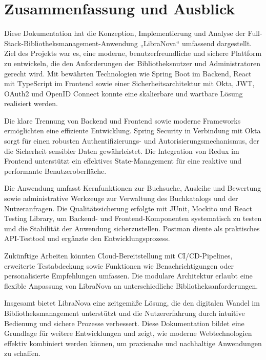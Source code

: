 \chapter{Zusammenfassung und Ausblick}

Diese Dokumentation hat die Konzeption, Implementierung und Analyse der Full-Stack-Bibliotheksmanagement-Anwendung „LibraNova“ umfassend dargestellt. Ziel des Projekts war es, eine moderne, benutzerfreundliche und sichere Plattform zu entwickeln, die den Anforderungen der Bibliotheksnutzer und Administratoren gerecht wird. Mit bewährten Technologien wie Spring Boot im Backend, React mit TypeScript im Frontend sowie einer Sicherheitsarchitektur mit Okta, JWT, OAuth2 und OpenID Connect konnte eine skalierbare und wartbare Lösung realisiert werden.

Die klare Trennung von Backend und Frontend sowie moderne Frameworks ermöglichten eine effiziente Entwicklung. Spring Security in Verbindung mit Okta sorgt für einen robusten Authentifizierungs- und Autorisierungsmechanismus, der die Sicherheit sensibler Daten gewährleistet. Die Integration von Redux im Frontend unterstützt ein effektives State-Management für eine reaktive und performante Benutzeroberfläche.

Die Anwendung umfasst Kernfunktionen zur Buchsuche, Ausleihe und Bewertung sowie administrative Werkzeuge zur Verwaltung des Buchkatalogs und der Nutzeranfragen. Die Qualitätssicherung erfolgte mit JUnit, Mockito und React Testing Library, um Backend- und Frontend-Komponenten systematisch zu testen und die Stabilität der Anwendung sicherzustellen. Postman diente als praktisches API-Testtool und ergänzte den Entwicklungsprozess.

Zukünftige Arbeiten könnten Cloud-Bereitstellung mit CI/CD-Pipelines, erweiterte Testabdeckung sowie Funktionen wie Benachrichtigungen oder personalisierte Empfehlungen umfassen. Die modulare Architektur erlaubt eine flexible Anpassung von LibraNova an unterschiedliche Bibliotheksanforderungen.

Insgesamt bietet LibraNova eine zeitgemäße Lösung, die den digitalen Wandel im Bibliotheksmanagement unterstützt und die Nutzererfahrung durch intuitive Bedienung und sichere Prozesse verbessert. Diese Dokumentation bildet eine Grundlage für weitere Entwicklungen und zeigt, wie moderne Webtechnologien effektiv kombiniert werden können, um praxisnahe und nachhaltige Anwendungen zu schaffen.